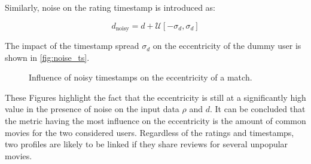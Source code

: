 Similarly, noise on the rating timestamp is introduced as:

\begin{equation}
d_{\text{noisy}} = d + \mathcal{U}\left[-\sigma_{d}, \sigma_{d}\right]
\end{equation}

The impact of the timestamp spread $\sigma_{d}$ on the eccentricity of the dummy user is shown in \autoref{fig:noise_ts}.

\begin{figure}[h]
	\centering
	
	\caption{Influence of noisy timestamps on the eccentricity of a match.}
	\label{fig:noise_ts}
\end{figure}

These Figures highlight the fact that the eccentricity is still at a significantly high value in the presence of noise on the input data $\rho$ and $d$. It can be concluded that the metric having the most influence on the eccentricity is the amount of common movies for the two considered users. Regardless of the ratings and timestamps, two profiles are likely to be linked if they share reviews for several unpopular movies.